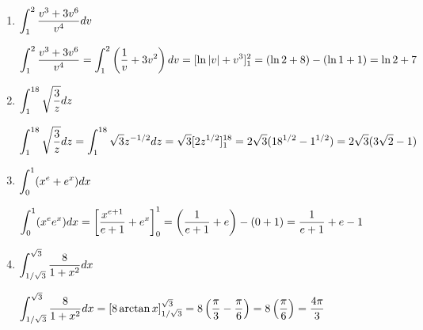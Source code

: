 \begin{enumerate}[1.]
\begin{Solution}
\end{Solution}

\item \begin{Question}
    
  $\displaystyle \int_1^2 \frac{v^3 + 3v^6}{v^4} dv$
\end{Question}

\begin{Solution}
  $\displaystyle \int_1^2 \frac{v^3 + 3v^6}{v^4} =
    \int_1^2 \left( \frac{1}{v} + 3v^2 \right) dv =
    [ \ln |v| + v^3]_1^2 = 
    ( \ln 2 + 8 ) - ( \ln 1 + 1) =
    \ln 2 + 7$
\end{Solution}

\item \begin{Question}
    
  $\displaystyle \int_1^{18} \sqrt{\frac{3}{z}} dz$
\end{Question}

\begin{Solution}
  $\displaystyle \int_1^{18} \sqrt{\frac{3}{z}} dz =
    \int_1^{18} \sqrt{3} z^{-1/2} dz =
    \sqrt{3} [ 2z^{1/2} ]_1^{18} =
    2 \sqrt{3} (18^{1/2} - 1^{1/2}) = 
    2 \sqrt{3} (3 \sqrt{2} - 1)$
\end{Solution}

\item \begin{Question}
    
  $\displaystyle \int_0^1 (x^e + e^x) dx$
\end{Question}

\begin{Solution}
    
  $\displaystyle \int_0^1 (x^e e^x) dx = 
    \left[ \frac{x^{e + 1}}{e + 1} + e^x \right]_0^1 =
    \left( \frac{1}{e + 1} + e \right) - (0 + 1) = 
    \frac{1}{e + 1} + e - 1$
\end{Solution}

\item \begin{Question}
    
  $\displaystyle \int_{1 / \sqrt{3}}^{\sqrt{3}} \frac{8}{1 + x^2} dx$
\end{Question}

\begin{Solution}
  $\displaystyle \int_{1 / \sqrt{3}}^{\sqrt{3}} \frac{8}{1 + x^2} dx =
    \left[ 8 \arctan x \right]_{1 / \sqrt{3}}^{\sqrt{3}} =
    8 \left( \frac{\pi}{3} - \frac{\pi}{6} \right) =
    8 \left( \frac{\pi}{6} \right) = \frac{4 \pi}{3}$
    

\end{Solution}
\end{enumerate}
